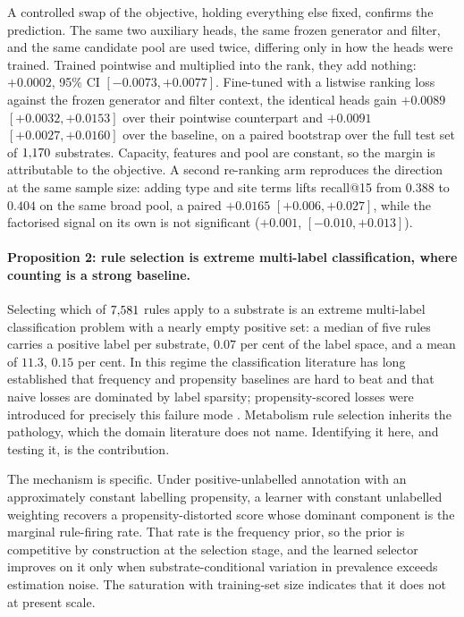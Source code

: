A controlled swap of the objective, holding everything else fixed, confirms the prediction. The
same two auxiliary heads, the same frozen generator and filter, and the same candidate pool are
used twice, differing only in how the heads were trained. Trained pointwise and multiplied into
the rank, they add nothing: $+0.0002$, 95\% CI $[-0.0073,+0.0077]$. Fine-tuned with a listwise
ranking loss against the frozen generator and filter context, the identical heads gain $+0.0089$
$[+0.0032,+0.0153]$ over their pointwise counterpart and $+0.0091$ $[+0.0027,+0.0160]$ over the
baseline, on a paired bootstrap over the full test set of $1{,}170$ substrates. Capacity, features
and pool are constant, so the margin is attributable to the objective. A second re-ranking arm
reproduces the direction at the same sample size: adding type and site terms lifts recall@15
from $0.388$ to $0.404$ on the same broad pool, a paired $+0.0165$ $[+0.006,+0.027]$, while the
factorised signal on its own is not significant ($+0.001$, $[-0.010,+0.013]$).

\paragraph{Proposition 2: rule selection is extreme multi-label classification, where counting is
a strong baseline.}
Selecting which of $7{,}581$ rules apply to a substrate is an extreme multi-label classification
problem with a nearly empty positive set: a median of five rules carries a positive label per
substrate, $0.07$ per cent of the label space, and a mean of $11.3$, $0.15$ per cent. In this regime the classification literature has long established that
frequency and propensity baselines are hard to beat and that naive losses are dominated by label
sparsity; propensity-scored losses were introduced for precisely this failure mode
\citep{Jain_2016}. Metabolism rule selection inherits the pathology, which the domain literature
does not name. Identifying it here, and testing it, is the contribution.

The mechanism is specific. Under positive-unlabelled annotation with an approximately constant
labelling propensity, a learner with constant unlabelled weighting recovers a propensity-distorted
score whose dominant component is the marginal rule-firing rate. That rate is the frequency
prior, so the prior is competitive by construction at the selection stage, and the learned
selector improves on it only when substrate-conditional variation in prevalence exceeds
estimation noise. The saturation with training-set size indicates that it does not at present
scale.

